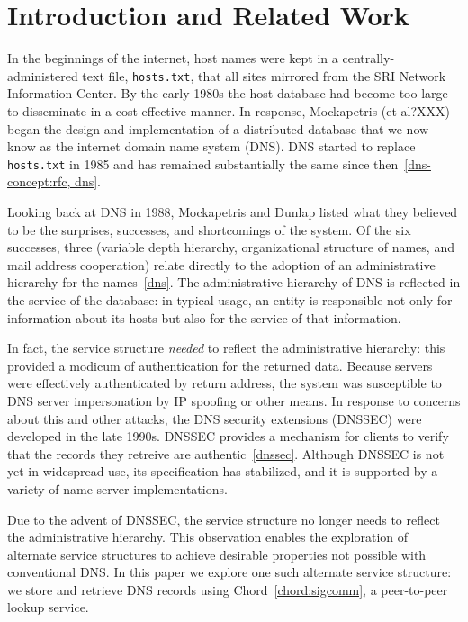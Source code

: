 \section{Introduction and Related Work}

In the beginnings of the internet, host names were kept
in a centrally-administered text file, {\tt hosts.txt}, that
all sites mirrored from the SRI Network Information Center.
By the early 1980s the host database had become too large
to disseminate in a cost-effective manner.
In response, Mockapetris (et al?XXX) began the design and
implementation of a distributed database that we now know
as the internet domain name system (DNS).
DNS started to replace {\tt hosts.txt} in 1985 and has remained
substantially the same since then~\ref{dns-concept:rfc, dns}.

Looking back at DNS in 1988, Mockapetris and Dunlap 
listed what they believed to be the surprises, successes,
and shortcomings of the system.  Of the six successes,
three (variable depth hierarchy, organizational structure
of names, and mail address cooperation) relate directly 
to the adoption of an administrative hierarchy for the names~\ref{dns}.
The administrative hierarchy of DNS is reflected in the 
service of the database: in typical usage, an
entity is responsible not only for information about its hosts
but also for the service of that information.

In fact, the service structure {\em needed} to reflect the 
administrative hierarchy: this provided a modicum of authentication
for the returned data.
Because servers were effectively authenticated by return address,
the system was susceptible to DNS server impersonation by 
IP spoofing or other means.
In response to concerns about this and
other attacks, the DNS security extensions (DNSSEC) were
developed in the late 1990s.
DNSSEC provides a mechanism for clients to verify that the
records they retreive are authentic~\ref{dnssec}.
Although DNSSEC is not yet in widespread use, its specification
has stabilized, and it is supported by a variety of name server
implementations.

Due to the advent of DNSSEC, the service structure no longer needs
to reflect the administrative hierarchy.
This observation enables the exploration of alternate service 
structures to achieve desirable properties not possible
with conventional DNS.  In this paper we explore one such
alternate service structure: we store and retrieve
DNS records using Chord~\ref{chord:sigcomm}, a peer-to-peer
lookup service.


